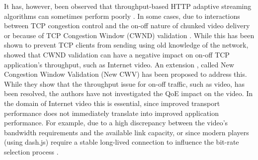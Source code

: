 \documentclass[10pt,sigconf]{acmart}
\begin{document}
It has, however, been observed that throughput-based HTTP adaptive streaming algorithms can sometimes perform poorly \cite{Spiteri-2016-BOLA,Kua-2017-a-survey-rate-adaptation-dash}. In some cases, due to interactions between TCP congestion control and the on-off nature of chunked video delivery \cite{Akhshabi-2012-http-adaptive-players-compete,Stohr-2017-where-are-the-sweet-spots-maci} or because of TCP Congestion Window (CWND) validation \cite{rfc2861-2000-padhye-congestion-window-validation}. While this has been shown to prevent TCP clients from sending using old knowledge of the network, \cite{Nazir-2014-performance-evaluation-congestion-window-validation-dash-newcwv} showed that CWND validation can have a negative impact on on-off TCP application's throughput, such as Internet video. An extension \cite{rfc7661-2015-fairhurst-new-cwnd-validation}, called New Congestion Window Validation (New CWV) has been proposed to address this. While they show that the throughput issue for on-off traffic, such as video, has been resolved, the authors have not investigated the QoE impact on the video. In the domain of Internet video this is essential, since improved transport performance does not immediately translate into improved application performance. For example, due to a high discrepancy between the video's bandwidth requirements and the available link capacity, or since modern players (using dash.js) require a stable long-lived connection to influence the bit-rate selection process \cite{Spiteri-2019-from-theory-to-practice-sabre}.



\end{document}
